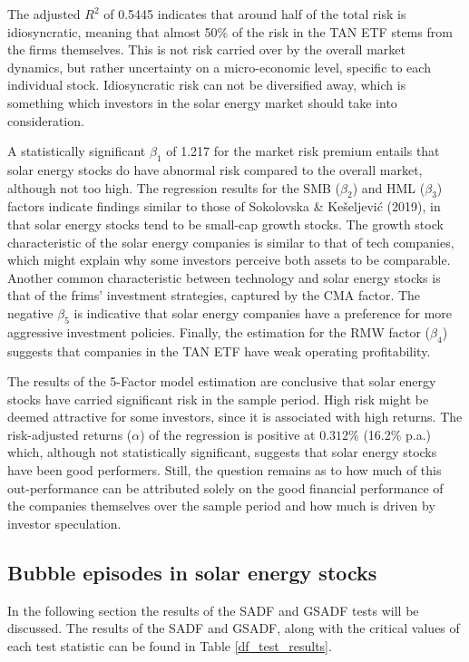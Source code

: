 \documentclass[11pt]{article}
\begin{document}
The adjusted $R^2$ of 0.5445 indicates that around half of the total risk is idiosyncratic, meaning that almost 50\% of the risk in the TAN ETF stems from the firms themselves. This is not risk carried over by the overall market dynamics, but rather uncertainty on a micro-economic level, specific to each individual stock. Idiosyncratic risk can not be diversified away, which is something which investors in the solar energy market should take into consideration.
\newline

A statistically significant $\beta_1$ of 1.217 for the market risk premium entails that solar energy stocks do have abnormal risk compared to the overall market, although not too high. The regression results for the SMB ($\beta_2$) and HML ($\beta_3$) factors indicate findings similar to those of Sokolovska \& Kešeljević (2019), in that solar energy stocks tend to be small-cap growth stocks. The growth stock characteristic of the solar energy companies is similar to that of tech companies, which might explain why some investors perceive both assets to be comparable. Another common characteristic between technology and solar energy stocks is that of the frims' investment strategies, captured by the CMA factor. The negative $\beta_5$ is indicative that solar energy companies have a preference for more aggressive investment policies. Finally, the estimation for the RMW factor ($\beta_4$) suggests that companies in the TAN ETF have weak operating profitability. 
\newline

The results of the 5-Factor model estimation are conclusive that solar energy stocks have carried significant risk in the sample period. High risk might be deemed attractive for some investors, since it is associated with high returns. The risk-adjusted returns ($\alpha$) of the regression is positive at $0.312$\% (16.2\% p.a.) which, although not statistically significant, suggests that solar energy stocks have been good performers. Still, the question remains as to how much of this out-performance can be attributed solely on the good financial performance of the companies themselves over the sample period and how much is driven by investor speculation.

\subsection{Bubble episodes in solar energy stocks}
In the following section the results of the SADF and GSADF tests will be discussed. The results of the SADF and GSADF, along with the critical values of each test statistic can be found in Table \ref{df_test_results}.
\end{document}
